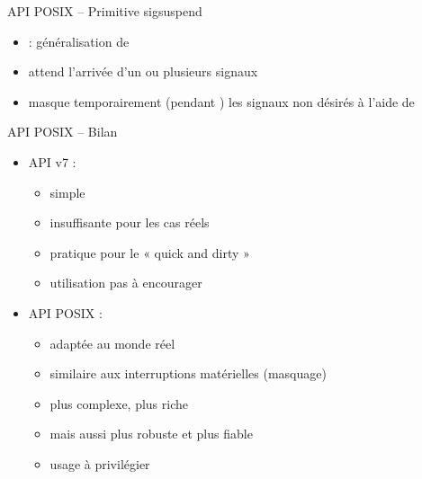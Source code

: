 \begin {frame} {API POSIX -- Primitive sigsuspend}
    \begin {itemize}
	\item {} : généralisation de 
	\item attend l'arrivée d'un ou plusieurs signaux
	\item masque temporairement (pendant ) les
	    signaux non désirés à l'aide de 

    \end {itemize}
\end {frame}

\begin {frame} {API POSIX -- Bilan}

    \begin {itemize}
	\item API v7 :
	    \begin {itemize}
		\item simple
		\item insuffisante pour les cas réels
		\item pratique pour le « quick and dirty »
		\item utilisation pas à encourager
	    \end {itemize}

	    \vspace* {2mm}

	\item API POSIX :
	    \begin {itemize}
		\item adaptée au monde réel
		\item similaire aux interruptions matérielles (masquage)
		\item plus complexe, plus riche
		\item mais aussi plus robuste et plus fiable
		\item usage à privilégier
	    \end {itemize}
    \end {itemize}
\end {frame}
